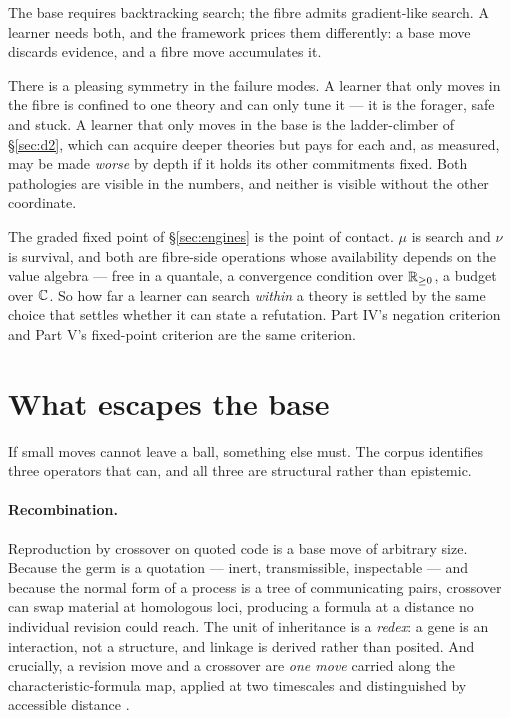 \begin{principle}
\label{prin:twosearch}
The base requires backtracking search; the fibre admits gradient-like search. A
learner needs both, and the framework prices them differently: a base move
discards evidence, and a fibre move accumulates it.
\end{principle}

There is a pleasing symmetry in the failure modes. A learner that only moves in
the fibre is confined to one theory and can only tune it --- it is the forager, safe
and stuck. A learner that only moves in the base is the ladder-climber of
\S\ref{sec:d2}, which can acquire deeper theories but pays for each and, as
measured, may be made \emph{worse} by depth if it holds its other commitments
fixed. Both pathologies are visible in the numbers, and neither is visible without
the other coordinate.

\begin{remark}
The graded fixed point of \S\ref{sec:engines} is the point of contact. $\mu$ is
search and $\nu$ is survival, and both are fibre-side operations whose availability
depends on the value algebra --- free in a quantale, a convergence condition over
$\mathbb{R}_{\ge0}$, a budget over $\mathbb{C}$. So how far a learner can search \emph{within} a
theory is settled by the same choice that settles whether it can state a
refutation. Part IV's negation criterion and Part V's fixed-point criterion are the
same criterion.
\end{remark}

\section{What escapes the base}
\label{sec:escape}

If small moves cannot leave a ball, something else must. The corpus identifies
three operators that can, and all three are structural rather than epistemic.

\paragraph{Recombination.} Reproduction by crossover on quoted code is a base move
of arbitrary size. Because the germ is a quotation --- inert, transmissible,
inspectable --- and because the normal form of a process is a tree of communicating
pairs, crossover can swap material at homologous loci, producing a formula at a
distance no individual revision could reach. The unit of inheritance is a
\emph{redex}: a gene is an interaction, not a structure, and linkage is derived
rather than posited. And crucially, a revision move and a crossover are \emph{one
move} carried along the characteristic-formula map, applied at two timescales and
distinguished by accessible distance \cite{ScientistNote}.

